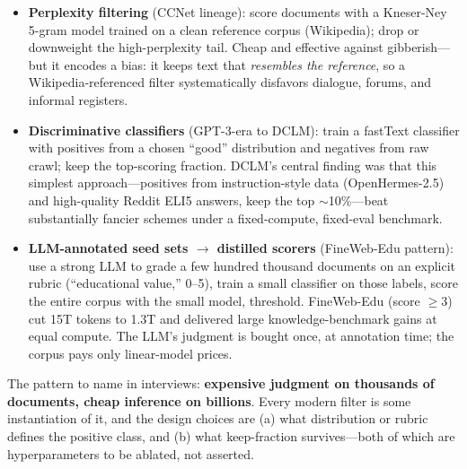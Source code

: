 \begin{itemize}
    \item \textbf{Perplexity filtering} (CCNet lineage): score documents with a Kneser-Ney 5-gram model trained on a clean reference corpus (Wikipedia); drop or downweight the high-perplexity tail. Cheap and effective against gibberish---but it encodes a bias: it keeps text that \textit{resembles the reference}, so a Wikipedia-referenced filter systematically disfavors dialogue, forums, and informal registers.
    \item \textbf{Discriminative classifiers} (GPT-3-era to DCLM): train a fastText classifier with positives from a chosen ``good'' distribution and negatives from raw crawl; keep the top-scoring fraction. DCLM's central finding was that this simplest approach---positives from instruction-style data (OpenHermes-2.5) and high-quality Reddit ELI5 answers, keep the top $\sim$10\%---beat substantially fancier schemes under a fixed-compute, fixed-eval benchmark.
    \item \textbf{LLM-annotated seed sets $\rightarrow$ distilled scorers} (FineWeb-Edu pattern): use a strong LLM to grade a few hundred thousand documents on an explicit rubric (``educational value,'' 0--5), train a small classifier on those labels, score the entire corpus with the small model, threshold. FineWeb-Edu (score $\geq 3$) cut 15T tokens to 1.3T and delivered large knowledge-benchmark gains at equal compute. The LLM's judgment is bought once, at annotation time; the corpus pays only linear-model prices.
\end{itemize}

The pattern to name in interviews: \textbf{expensive judgment on thousands of documents, cheap inference on billions}. Every modern filter is some instantiation of it, and the design choices are (a) what distribution or rubric defines the positive class, and (b) what keep-fraction survives---both of which are hyperparameters to be ablated, not asserted.

